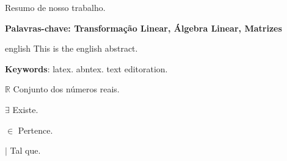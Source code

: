 \documentclass[
12pt,
 a4paper,
    brazil,
    oneside
    ]{abntex2}
\begin{document}
	
	
	\frenchspacing 
	
	\imprimircapa
	
	\imprimirfolhaderosto
	
	\setlength{\absparsep}{18pt} %
	\begin{resumo}
		Resumo de nosso trabalho.
		
		\textbf{Palavras-chave: Transformação Linear, Álgebra Linear, Matrizes}
	\end{resumo}
		
	
	\begin{resumo}[Abstract]
		\begin{otherlanguage*}{english}
			This is the english abstract.
			
			\vspace{\onelineskip}
			
			\noindent 
			\textbf{Keywords}: latex. abntex. text editoration.
		\end{otherlanguage*}
	\end{resumo}
	
	\listoftables*
	\cleardoublepage
	
	\begin{simbolos}
		\item[$ \mathbb{R} $] Conjunto dos números reais.
		\item[$\exists$] Existe.
		\item[$\in$] Pertence.
		\item[$\mid$] Tal que.
	\end{simbolos}
	
	
	\tableofcontents*
	\cleardoublepage
	
	
	\textual
	
	
		
	
	
	
	
	
	
	
		
	
	

		
\end{document}
